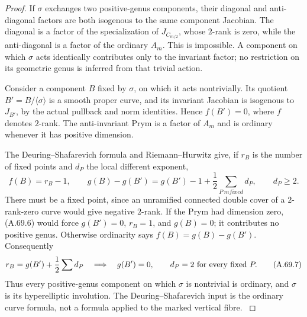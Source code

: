 \begin{proof}
If \(\sigma\) exchanges two positive-genus components, their
diagonal and anti-diagonal factors are both isogenous to the same
component Jacobian. The diagonal is a factor of the specialization
of \(J_{C_{m/2}}\), whose \(2\)-rank is zero, while the
anti-diagonal is a factor of the ordinary \(A_m\). This is
impossible. A component on which \(\sigma\) acts identically
contributes only to the invariant factor; no restriction on its
geometric genus is inferred from that trivial action.

Consider a component \(B\) fixed by \(\sigma\), on which it acts
nontrivially. Its quotient \(B'=B/\langle\sigma\rangle\) is a
smooth proper curve, and its invariant Jacobian is isogenous to
\(J_{B'}\), by the actual pullback and norm identities. Hence
\(f(B')=0\), where \(f\) denotes \(2\)-rank. The anti-invariant
Prym is a factor of \(A_m\) and is ordinary whenever it has
positive dimension.

The Deuring--Shafarevich formula and Riemann--Hurwitz give, if
\(r_B\) is the number of fixed points and \(d_P\) the local
different exponent,
\[
 f(B)=r_B-1,\qquad
 g(B)-g(B')=g(B')-1+\frac12\sum_{P\ {
m fixed}}d_P,
 \qquad d_P\ge2.                                  \tag{A.69.6}
\]
There must be a fixed point, since an unramified connected
double cover of a \(2\)-rank-zero curve would give negative
\(2\)-rank. If the Prym had dimension zero, (A.69.6) would force
\(g(B')=0\), \(r_B=1\), and \(g(B)=0\); it contributes no
positive genus. Otherwise ordinarity says
\(f(B)=g(B)-g(B')\). Consequently
\[
      r_B=g(B')+\frac12\sum d_P
      \quad\Longrightarrow\quad
      g(B')=0,\qquad d_P=2\ \hbox{for every fixed }P.
                                                        \tag{A.69.7}
\]
Thus every positive-genus component on which \(\sigma\) is
nontrivial is ordinary, and \(\sigma\) is its hyperelliptic
involution. The Deuring--Shafarevich input is the ordinary
curve formula, not a formula applied to the marked vertical fibre.
\cite{fghCrew1984,fghYang2024}


\end{proof}
